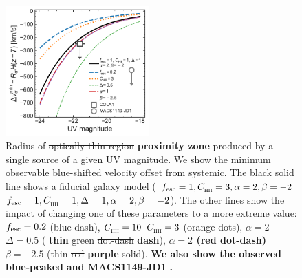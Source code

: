 \documentclass[fleqn,usenatbib]{mnras}
\providecommand{\DIFadd}[1]{{\protect\color{Green} {\bf #1}}} %
\providecommand{\DIFdel}[1]{{\protect\color{Gray} \scriptsize \sout{#1}}} %
\providecommand{\DIFaddFL}[1]{\DIFadd{#1}} %
\providecommand{\DIFdelFL}[1]{\DIFdel{#1}} %
\providecommand{\DIFaddbeginFL}{} %
\providecommand{\DIFaddendFL}{} %
\providecommand{\DIFdelbeginFL}{} %
\providecommand{\DIFdelendFL}{} %
\newcommand{\DIFscaledelfig}{0.5}
\newlength{\DIFdelgraphicswidth} %
\newlength{\DIFdelgraphicsheight} %
\newcommand{\DIFaddincludegraphics}[2][]{{\color{purple}\fbox{\DIFOincludegraphics[#1]{#2}}}} %
\newcommand{\DIFdelincludegraphics}[2][]{%
\sbox{\DIFdelgraphicsbox}{\DIFOincludegraphics[#1]{#2}}%
\settoboxwidth{\DIFdelgraphicswidth}{\DIFdelgraphicsbox} %
\settoboxtotalheight{\DIFdelgraphicsheight}{\DIFdelgraphicsbox} %
\scalebox{\DIFscaledelfig}{%
\parbox[b]{\DIFdelgraphicswidth}{\usebox{\DIFdelgraphicsbox}\\[-\baselineskip] \rule{\DIFdelgraphicswidth}{0em}}\llap{\resizebox{\DIFdelgraphicswidth}{\DIFdelgraphicsheight}{%
\setlength{\unitlength}{\DIFdelgraphicswidth}%
\begin{picture}(1,1)%
\thicklines\linethickness{2pt} %
{\color[rgb]{1,0,0}\put(0,0){\framebox(1,1){}}}%
{\color[rgb]{1,0,0}\put(0,0){\line( 1,1){1}}}%
{\color[rgb]{1,0,0}\put(0,1){\line(1,-1){1}}}%
\end{picture}%
}\hspace*{3pt}}} %
} %
\DeclareRobustCommand{\DIFaddbeginFL}{\DIFOaddbeginFL \let\includegraphics\DIFaddincludegraphics} %
\DeclareRobustCommand{\DIFaddendFL}{\DIFOaddendFL \let\includegraphics\DIFOincludegraphics} %
\DeclareRobustCommand{\DIFdelbeginFL}{\DIFOdelbeginFL \let\includegraphics\DIFdelincludegraphics} %
\DeclareRobustCommand{\DIFdelendFL}{\DIFOaddendFL \let\includegraphics\DIFOincludegraphics} %
\begin{document}
\begin{figure}
    \includegraphics[width=0.49\textwidth]{figs/fig6.pdf}
    \caption{Radius of \DIFdelbeginFL \DIFdelFL{optically thin region }\DIFdelendFL \DIFaddbeginFL \DIFaddFL{proximity zone }\DIFaddendFL produced by a single source of a given UV magnitude. We show the minimum observable blue-shifted velocity offset from systemic. The black solid line shows a fiducial galaxy model (\DIFdelbeginFL \DIFdelFL{$\fesc=1, \clump=3, \alpha=2, \beta=-2$}\DIFdelendFL \DIFaddbeginFL \DIFaddFL{$\fesc=1, \clump=1, \Delta=1, \alpha=2, \beta=-2$}\DIFaddendFL ). The other lines show the impact of changing one of these parameters to a more extreme value: $\fesc=0.2$ (blue dash), \DIFdelbeginFL \DIFdelFL{$\clump=10$ }\DIFdelendFL \DIFaddbeginFL \DIFaddFL{$\clump=3$ }\DIFaddendFL (orange dots), \DIFdelbeginFL \DIFdelFL{$\alpha=2$ }\DIFdelendFL \DIFaddbeginFL \DIFaddFL{$\Delta=0.5$ }\DIFaddendFL (\DIFaddbeginFL \DIFaddFL{thin }\DIFaddendFL green \DIFdelbeginFL \DIFdelFL{dot-dash}\DIFdelendFL \DIFaddbeginFL \DIFaddFL{dash}\DIFaddendFL ), \DIFaddbeginFL \DIFaddFL{$\alpha=2$ (red dot-dash) }\DIFaddendFL $\beta=-2.5$ (thin \DIFdelbeginFL \DIFdelFL{red }\DIFdelendFL \DIFaddbeginFL \DIFaddFL{purple }\DIFaddendFL solid). \DIFaddbeginFL \DIFaddFL{We also show the observed blue-peaked }\lya \DIFaddFL{emitters COLA1 }\citep{Hu2016,Matthee2018b} \DIFaddFL{and MACS1149-JD1 }\citep{Hashimoto2018a}\DIFaddFL{.}\DIFaddendFL }
    \label{fig:R_opticallythin}
\end{figure}
\end{document}
